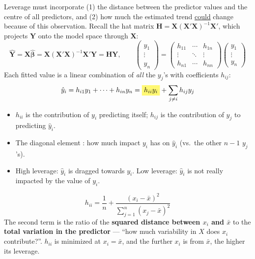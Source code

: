 \begin{definition}
    Leverage must incorporate (1) the distance between the predictor values and the centre of
    all predictors, and (2) how much the estimated trend \underline{could} change because of
    this observation. Recall the hat matrix $\mathbf{H}=\mathbf{X}(\mathbf{X}'\mathbf{X})^{-1}\mathbf{X}'$,
    which projects $\mathbf{Y}$ onto the model space through $\mathbf{X}$:
    \[\hat{\mathbf{Y}}=\mathbf{X}\hat{\boldsymbol\beta}=\mathbf{X}(\mathbf{X}'\mathbf{X})^{-1}\mathbf{X}'\mathbf{Y}=\mathbf{H}\mathbf{Y},\qquad
    \begin{pmatrix}\hat y_1\\ \vdots\\ \hat y_n\end{pmatrix}=
    \begin{pmatrix}h_{11}&\cdots&h_{1n}\\ \vdots&\ddots&\vdots\\ h_{n1}&\cdots&h_{nn}\end{pmatrix}
    \begin{pmatrix}y_1\\ \vdots\\ y_n\end{pmatrix}\]
    Each fitted value is a linear combination of \emph{all} the $y_j$'s with coefficients $h_{ij}$:
    \[\hat y_i=h_{i1}y_1+\cdots+h_{in}y_n=\hly{h_{ii}y_i}+\sum_{j\neq i}h_{ij}y_j\]
    \begin{itemize}
        \item $h_{ii}$ is the contribution of $y_i$ predicting itself; $h_{ij}$ is the
        contribution of $y_j$ to predicting $\hat y_i$.
        \item The diagonal element : how much
        impact $y_i$ has on $\hat y_i$ (vs.\ the other $n-1$ $y_j$'s).
        \item High leverage: $\hat y_i$ is dragged towards $y_i$. Low leverage: $\hat y_i$ is
        not really impacted by the value of $y_i$.
    \end{itemize}
\end{definition}

\begin{proposition}
    \[\boxed{h_{ii}=\frac1n+\frac{(x_i-\bar x)^2}{\sum_{j=1}^n(x_j-\bar x)^2}}\]
    The second term is the ratio of the \textbf{squared distance between $x_i$ and $\bar x$} to
    the \textbf{total variation in the predictor} --- ``how much variability in $X$ does $x_i$
    contribute?''. $h_{ii}$ is minimized at $x_i=\bar x$, and the further $x_i$ is from $\bar x$,
    the higher its leverage.
\end{proposition}

